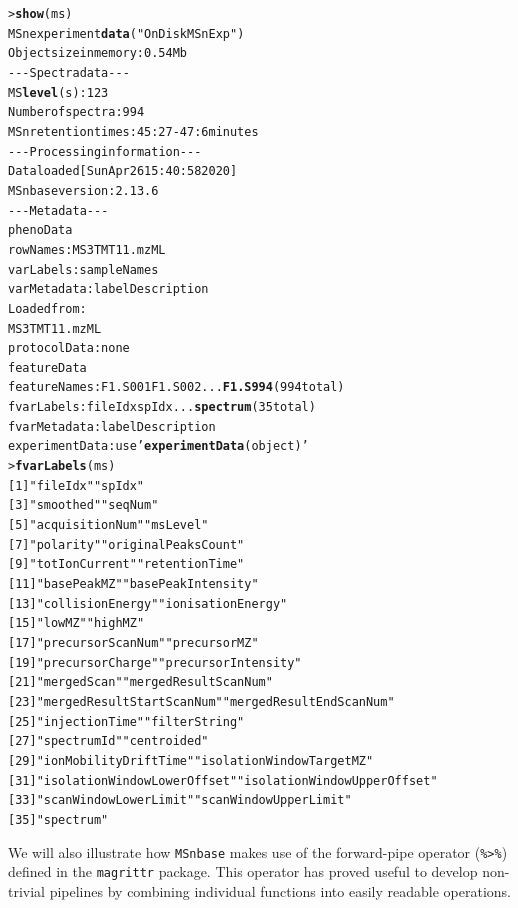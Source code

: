\documentclass[journal=jacsat,manuscript=article]{achemso}\usepackage[]{graphicx}\usepackage[]{color}
\makeatletter
\newcommand{\hlstr}[1]{\textcolor[rgb]{0.192,0.494,0.8}{#1}}%
\newcommand{\hlkwd}[1]{\textcolor[rgb]{0.737,0.353,0.396}{\textbf{#1}}}%
\newenvironment{kframe}{%
 \def\at@end@of@kframe{}%
 \ifinner\ifhmode%
  \def\at@end@of@kframe{\end{minipage}}%
  \begin{minipage}{\columnwidth}%
 \fi\fi%
 \def\FrameCommand##1{\hskip\@totalleftmargin \hskip-\fboxsep
 \colorbox{shadecolor}{##1}\hskip-\fboxsep
     \hskip-\linewidth \hskip-\@totalleftmargin \hskip\columnwidth}%
 \MakeFramed {\advance\hsize-\width
   \@totalleftmargin\z@ \linewidth\hsize
   \@setminipage}}%
 {\par\unskip\endMakeFramed%
 \at@end@of@kframe}
\newenvironment{knitrout}{}{} %
\makeatother
\begin{document}
\begin{knitrout}
\color{fgcolor}\begin{kframe}
\begin{alltt}
> \hlkwd{show}(ms)
MSn experiment \hlkwd{data} (\hlstr{"OnDiskMSnExp"})
Object size in memory: 0.54 Mb
- - - Spectra data - - -
 MS \hlkwd{level}(s): 1 2 3 
 Number of spectra: 994 
 MSn retention times: 45:27 - 47:6 minutes
- - - Processing information - - -
Data loaded [Sun Apr 26 15:40:58 2020] 
 MSnbase version: 2.13.6 
- - - Meta data  - - -
phenoData
  rowNames: MS3TMT11.mzML
  varLabels: sampleNames
  varMetadata: labelDescription
Loaded from:
  MS3TMT11.mzML 
protocolData: none
featureData
  featureNames: F1.S001 F1.S002 ... \hlkwd{F1.S994} (994 total)
  fvarLabels: fileIdx spIdx ... \hlkwd{spectrum} (35 total)
  fvarMetadata: labelDescription
experimentData: use \hlstr{'\hlkwd{experimentData}(object)'}
> \hlkwd{fvarLabels}(ms)
 [1] \hlstr{"fileIdx"}                    \hlstr{"spIdx"}
 [3] \hlstr{"smoothed"}                   \hlstr{"seqNum"}
 [5] \hlstr{"acquisitionNum"}             \hlstr{"msLevel"}
 [7] \hlstr{"polarity"}                   \hlstr{"originalPeaksCount"}
 [9] \hlstr{"totIonCurrent"}              \hlstr{"retentionTime"}
[11] \hlstr{"basePeakMZ"}                 \hlstr{"basePeakIntensity"}
[13] \hlstr{"collisionEnergy"}            \hlstr{"ionisationEnergy"}
[15] \hlstr{"lowMZ"}                      \hlstr{"highMZ"}
[17] \hlstr{"precursorScanNum"}           \hlstr{"precursorMZ"}
[19] \hlstr{"precursorCharge"}            \hlstr{"precursorIntensity"}
[21] \hlstr{"mergedScan"}                 \hlstr{"mergedResultScanNum"}
[23] \hlstr{"mergedResultStartScanNum"}   \hlstr{"mergedResultEndScanNum"}
[25] \hlstr{"injectionTime"}              \hlstr{"filterString"}
[27] \hlstr{"spectrumId"}                 \hlstr{"centroided"}
[29] \hlstr{"ionMobilityDriftTime"}       \hlstr{"isolationWindowTargetMZ"}
[31] \hlstr{"isolationWindowLowerOffset"} \hlstr{"isolationWindowUpperOffset"}
[33] \hlstr{"scanWindowLowerLimit"}       \hlstr{"scanWindowUpperLimit"}
[35] \hlstr{"spectrum"}
\end{alltt}
\end{kframe}
\end{knitrout}

We will also illustrate how \texttt{MSnbase} makes use of the
forward-pipe operator (\texttt{\%>\%}) defined in the
\texttt{magrittr} package. This operator has proved useful to develop
non-trivial pipelines by combining individual functions into easily
readable operations.
\end{document}

